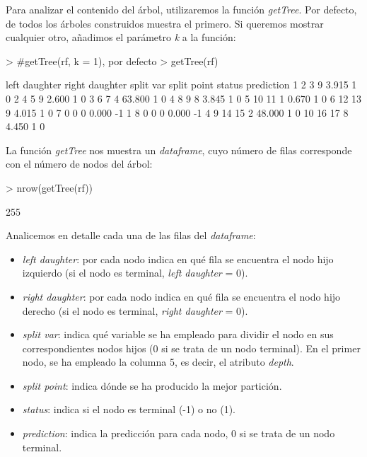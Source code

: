 \documentclass [a4paper] {article}
\begin{document}
Para analizar el contenido del árbol, utilizaremos la función \textit{getTree}. Por defecto, de todos los árboles construidos muestra el primero. Si queremos mostrar cualquier otro, añadimos el parámetro \textit{k} a la función:
\begin{Schunk}
\begin{Sinput}
> #getTree(rf, k = 1), por defecto
> getTree(rf) %>% head(10)
\end{Sinput}
\begin{Soutput}
   left daughter right daughter split var split point status prediction
1              2              3         9       3.915      1          0
2              4              5         9       2.600      1          0
3              6              7         4      63.800      1          0
4              8              9         8       3.845      1          0
5             10             11         1       0.670      1          0
6             12             13         9       4.015      1          0
7              0              0         0       0.000     -1          1
8              0              0         0       0.000     -1          4
9             14             15         2      48.000      1          0
10            16             17         8       4.450      1          0
\end{Soutput}
\end{Schunk}

La función \textit{getTree} nos muestra un \textit{dataframe}, cuyo número de filas corresponde con el número de nodos del árbol:
\begin{Schunk}
\begin{Sinput}
> nrow(getTree(rf))
\end{Sinput}
\begin{Soutput}
[1] 255
\end{Soutput}
\end{Schunk}

\newpage
Analicemos en detalle cada una de las filas del \textit{dataframe}:

\begin{itemize}
  \item \textit{left daughter}: por cada nodo indica en qué fila se encuentra el nodo hijo izquierdo (si el nodo es terminal, \textit{left daughter} = 0).
  \item \textit{right daughter}: por cada nodo indica en qué fila se encuentra el nodo hijo derecho (si el nodo es terminal, \textit{right daughter} = 0).
  \item \textit{split var}: indica qué variable se ha empleado para dividir el nodo en sus correspondientes nodos hijos (0 si se trata de un nodo terminal). En el primer nodo, se ha empleado la columna 5, es decir, el atributo \textit{depth}.
  \item \textit{split point}: indica dónde se ha producido la mejor partición.
  \item \textit{status}: indica si el nodo es terminal (-1) o no (1).
  \item \textit{prediction}: indica la predicción para cada nodo, 0 si se trata de un nodo terminal.
\end{itemize}
\end{document}
